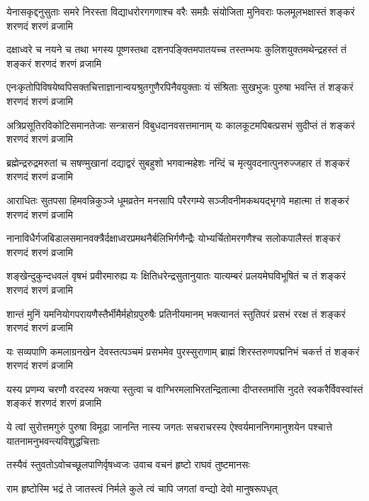 \twolineshloka
{येनासकृद्दनुसुताः समरे निरस्ता विद्याधरोरगगणाश्च वरैः समग्रैः}
{संयोजिता मुनिवराः फलमूलभक्षास्तं शङ्करं शरणदं शरणं व्रजामि} %

\twolineshloka
{दक्षाध्वरे च नयने च तथा भगस्य पूष्णस्तथा दशनपङ्क्तिमपातयच्च}
{तस्तम्भयः कुलिशयुक्तमथेन्द्रहस्तं तं शङ्करं शरणदं शरणं व्रजामि} %

\twolineshloka
{एनःकृतोपिविषयेष्वपिसक्तचित्ताज्ञानान्वयश्रुतगुणैरपिनैवयुक्ताः}
{यं संश्रिताः सुखभुजः पुरुषा भवन्ति तं शङ्करं शरणदं शरणं व्रजामि} %

\twolineshloka
{अत्रिप्रसूतिरविकोटिसमानतेजाः सन्त्रासनं विबुधदानवसत्तमानाम्}
{यः कालकूटमपिबत्प्रसभं सुदीप्तं तं शङ्करं शरणदं शरणं व्रजामि} %

\twolineshloka
{ब्रह्मेन्द्ररुद्रमरुतां च सषण्मुखानां दद्याद्वरं सुबहुशो भगवान्महेशः}
{नन्दिं च मृत्युवदनात्पुनरुज्जहार तं शङ्करं शरणदं शरणं व्रजामि} %

\twolineshloka
{आराधितः सुतपसा हिमवन्निकुञ्जे धूमव्रतेन मनसापि परैरगम्ये}
{सञ्जीवनीमकथयद्भृगवे महात्मा तं शङ्करं शरणदं शरणं व्रजामि} %

\twolineshloka
{नानाविधैर्गजबिडालसमानवक्त्रैर्दक्षाध्वरप्रमथनैर्बलिभिर्गणैन्द्रैः }
{योभ्यर्चितोमरगणैश्च सलोकपालैस्तं शङ्करं शरणदं शरणं व्रजामि} %

\twolineshloka
{शङ्खेन्दुकुन्दधवलं वृषभं प्रवीरमारुह्य यः क्षितिधरेन्द्रसुतानुयातः}
{यात्यम्बरं प्रलयमेघविभूषितं च तं शङ्करं शरणदं शरणं व्रजामि} %

\twolineshloka
{शान्तं मुनिं यमनियोगपरायणैस्तैर्भीमैर्महोग्रपुरुषैः प्रतिनीयमानम्}
{भक्त्यानतं स्तुतिपरं प्रसभं ररक्ष तं शङ्करं शरणदं शरणं व्रजामि} %

\twolineshloka
{यः सव्यपाणि कमलाग्रनखेन देवस्तत्पञ्चमं प्रसभमेव पुरस्सुराणाम्}
{ब्राह्मं शिरस्तरुणपद्मनिभं चकर्त्त तं शङ्करं शरणदं शरणं व्रजामि} %

\twolineshloka
{यस्य प्रणम्य चरणौ वरदस्य भक्त्या स्तुत्वा च वाग्भिरमलाभिरतन्द्रितात्मा}
{दीप्तस्तमांसि नुदते स्वकरैर्विवस्वांस्तं शङ्करं शरणदं शरणं व्रजामि} %

\twolineshloka
{ये त्वां सुरोत्तमगुरुं पुरुषा विमूढा जानन्ति नास्य जगतः सचराचरस्य}
{ऐश्वर्यमाननिगमानुशयेन पश्चात्ते यातनामनुभवन्त्यविशुद्धचित्ताः} %

\twolineshloka
{तस्यैवं स्तुवतोऽवोचच्छूलपाणिर्वृषध्वजः}
{उवाच वचनं हृष्टो राघवं तुष्टमानसः} %

\twolineshloka
{राम हृष्टोस्मि भद्रं ते जातस्त्वं निर्मले कुले}
{त्वं चापि जगतां वन्द्यो देवो मानुषरूपधृत्} %

